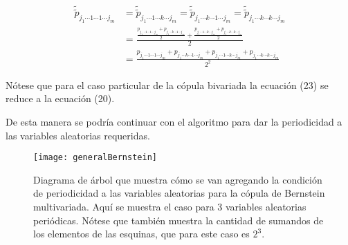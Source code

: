 \begin{align}
	{\tilde{\tilde{p}}}_{j_{1}\cdots 1\cdots 1\cdots j_{m}} &= 
{\tilde{\tilde{p}}}_{j_{1}\cdots 1\cdots k\cdots j_{m}} = 
{\tilde{\tilde{p}}}_{j_{1}\cdots k\cdots 1\cdots j_{m}} = 
{\tilde{\tilde{p}}}_{j_{1}\cdots k\cdots k\cdots j_{m}} \\
&= \frac{\frac{p_{j_{1}\cdots 1\cdots 1\cdots j_{m}} + p_{j_{1}\cdots k\cdots 1\cdots j_{m}}}{2} + \frac{p_{j_{1}\cdots 1\cdots k\cdots j_{m}} + p_{j_{1}\cdots k\cdots k\cdots j_{m}}}{2}}{2} \\
&= \frac{p_{j_{1}\cdots 1\cdots 1\cdots j_{m}} + p_{j_{1}\cdots k\cdots 1\cdots j_{m}} + p_{j_{1}\cdots 1\cdots k\cdots j_{m}} + p_{j_{1}\cdots k\cdots k\cdots j_{m}}}{2^{2}}
\end{align}


N\'otese que para el caso particular de la c\'opula bivariada la ecuaci\'on (23) se reduce a la ecuaci\'on (20).

De esta manera se podr\'ia continuar con el algoritmo para dar la periodicidad a las variables aleatorias requeridas.

\begin{figure}
	\centering
\texttt{[image: generalBernstein]}
	\caption{Diagrama de \'arbol que muestra c\'omo se van agregando la condici\'on de periodicidad a las variables aleatorias para la c\'opula de Bernstein multivariada. Aqu\'i se muestra el caso para 3 variables aleatorias peri\'odicas. N\'otese que tambi\'en muestra la cantidad de sumandos de los elementos de las esquinas, que para este caso es \(2^{3}\).}
	\label{f:treeDiagPer}
\end{figure}


